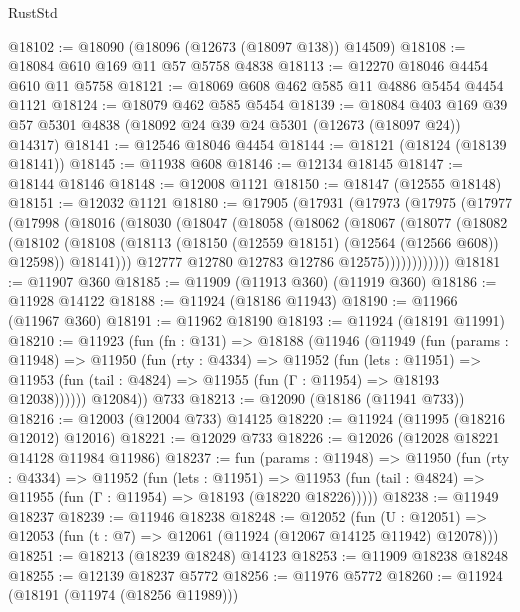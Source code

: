 \begin{lexlean}{RustStd}
\begin{coremodule}
{\begin{coremodule}
{{{{{{{{{{{{{{{{{{{{{{{{{{{{{{{{{{{{{{{{{{{{{{{{{{{{{{{{{{{{{{{{{{{{{{{{{{{{{{{{@18102 := @18090 (@18096 (@12673 (@18097 @138)) @14509)
@18108 := @18084 @610 @169 @11 @57 @5758 @4838
@18113 := @12270 @18046 @4454 @610 @11 @5758
@18121 := @18069 @608 @462 @585 @11 @4886 @5454 @4454 @1121
@18124 := @18079 @462 @585 @5454
@18139 := @18084
    @403
    @169
    @39
    @57
    @5301
    @4838
    (@18092 @24 @39 @24 @5301 (@12673 (@18097 @24)) @14317)
@18141 := @12546 @18046 @4454
@18144 := @18121 (@18124 (@18139 @18141))
@18145 := @11938 @608
@18146 := @12134 @18145
@18147 := @18144 @18146
@18148 := @12008 @1121
@18150 := @18147 (@12555 @18148)
@18151 := @12032 @1121
@18180 := @17905
    (@17931
      (@17973
        (@17975
          (@17977
            (@17998
              (@18016
                (@18030
                  (@18047
                    (@18058
                      (@18062
                        (@18067
                          (@18077
                            (@18082
                              (@18102
                                (@18108
                                  (@18113 (@18150 (@12559 @18151) (@12564 (@12566 @608)) @12598))
                                  @18141)))
                            @12777
                            @12780
                            @12783
                            @12786
                            @12575))))))))))))
@18181 := @11907 @360
@18185 := @11909 (@11913 @360) (@11919 @360)
@18186 := @11928 @14122
@18188 := @11924 (@18186 @11943)
@18190 := @11966 (@11967 @360)
@18191 := @11962 @18190
@18193 := @11924 (@18191 @11991)
@18210 := @11923
    (fun (fn : @131) =>
    @18188
      (@11946
        (@11949
          (fun (params : @11948) =>
          @11950
            (fun (rty : @4334) =>
            @11952
              (fun (lets : @11951) =>
              @11953 (fun (tail : @4824) => @11955 (fun (Γ : @11954) => @18193 @12038))))))
        @12084))
    @733
@18213 := @12090 (@18186 (@11941 @733))
@18216 := @12003 (@12004 @733) @14125
@18220 := @11924 (@11995 (@18216 @12012) @12016)
@18221 := @12029 @733
@18226 := @12026 (@12028 @18221 @14128 @11984 @11986)
@18237 := fun (params : @11948) =>
  @11950
    (fun (rty : @4334) =>
    @11952
      (fun (lets : @11951) =>
      @11953 (fun (tail : @4824) => @11955 (fun (Γ : @11954) => @18193 (@18220 @18226)))))
@18238 := @11949 @18237
@18239 := @11946 @18238
@18248 := @12052
    (fun (U : @12051) => @12053 (fun (t : @7) => @12061 (@11924 (@12067 @14125 @11942) @12078)))
@18251 := @18213 (@18239 @18248) @14123
@18253 := @11909 @18238 @18248
@18255 := @12139 @18237 @5772
@18256 := @11976 @5772
@18260 := @11924 (@18191 (@11974 (@18256 @11989)))
}}}}}}}}}}}}}}}}}}}}}}}}}}}}}}}}}}}}}}}}}}}}}}}}}}}}}}}}}}}}}}}}}}}}}}}}}}}}}}}}
\end{coremodule}}
\end{coremodule}
\end{lexlean}
